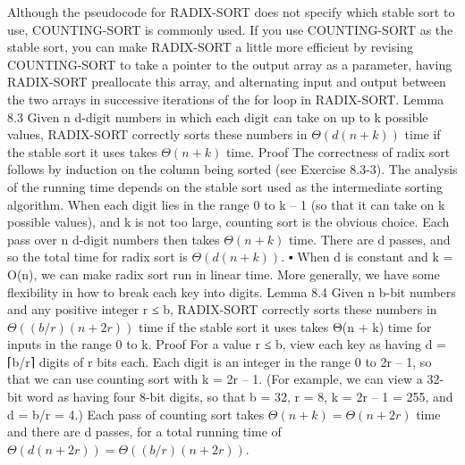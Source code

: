Although the pseudocode for RADIX-SORT does not specify which stable sort to use, COUNTING-SORT is commonly used. If you use COUNTING-SORT as the stable sort, you can make RADIX-SORT a little more efficient by revising COUNTING-SORT to take a pointer to the output array as a parameter, having RADIX-SORT preallocate this array, and alternating input and output between the two arrays in successive iterations of the for loop in RADIX-SORT.
Lemma 8.3
Given n d-digit numbers in which each digit can take on up to k possible values, RADIX-SORT correctly sorts these numbers in $\Theta\left(d(n + k)\right)$ time if the stable sort it uses takes $\Theta\left(n + k\right)$ time.
Proof The correctness of radix sort follows by induction on the column being sorted (see Exercise 8.3-3). The analysis of the running time depends on the stable sort used as the intermediate sorting algorithm. When each digit lies in the range 0 to k – 1 (so that it can take on k possible values), and k is not too large, counting sort is the obvious choice. Each pass over n d-digit numbers then takes $\Theta(n + k)$ time. There are d passes, and so the total time for radix sort is $\Theta\left(d(n + k)\right)$.
▪
When d is constant and k = O(n), we can make radix sort run in linear time. More generally, we have some flexibility in how to break each key into digits.
Lemma 8.4
Given n b-bit numbers and any positive integer r ≤ b, RADIX-SORT correctly sorts these numbers in $\Theta\left((b/r)(n + 2r)\right)$ time if the stable sort it uses takes Θ(n + k) time for inputs in the range 0 to k.
Proof For a value r ≤ b, view each key as having d = ⌈b/r⌉ digits of r bits each. Each digit is an integer in the range 0 to 2r – 1, so that we can use counting sort with k = 2r – 1. (For example, we can view a 32-bit word as having four 8-bit digits, so that b = 32, r = 8, k = 2r – 1 = 255, and d = b/r = 4.) Each pass of counting sort takes $ \Theta \left(n + k \right) = \Theta\left(n + 2r\right)$ time and there are d passes, for a total running time of $\Theta\left(d(n + 2r)\right) = \Theta\left((b/r)(n + 2r)\right)$.

